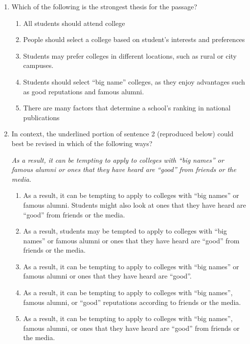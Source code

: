 \begin{enumerate}

\item Which of the following is the strongest thesis for the passage?

\bigskip
\begin{enumerate}[label=(\Alph*)]
\item All students should attend college
\item People should select a college based on student's interests and preferences
\item Students may prefer colleges in different locations, such as rural or city campuses.
\item Students should select ``big name'' colleges, as they enjoy advantages such as good reputations and famous alumni.
\item There are many factors that determine a school's ranking in national publications
\end{enumerate}

\bigskip
\item In context, the underlined portion of sentence 2 (reproduced below) could best be revised in which of the following ways?

\bigskip
\textit{As a result, it can be tempting to apply to colleges with ``big names'' or famous alumni or ones that they have heard are ``good'' from friends or the media.}

\bigskip
\begin{enumerate}[label=(\Alph*)]
\item As a result, it can be tempting to apply to colleges with ``big names'' or famous alumni. Students might also look at ones that they have heard are ``good'' from friends or the media.
\item As a result, students may be tempted to apply to colleges with ``big names'' or famous alumni or ones that they have heard are ``good'' from friends or the media.
\item As a result, it can be tempting to apply to colleges with ``big names'' or famous alumni or ones that they have heard are ``good''.
\item As a result, it can be tempting to apply to colleges with ``big names'', famous alumni, or ``good'' reputations according to friends or the media.
\item As a result, it can be tempting to apply to colleges with ``big names'', famous alumni, or ones that they have heard are ``good'' from friends or the media.
\end{enumerate}


\end{enumerate}
